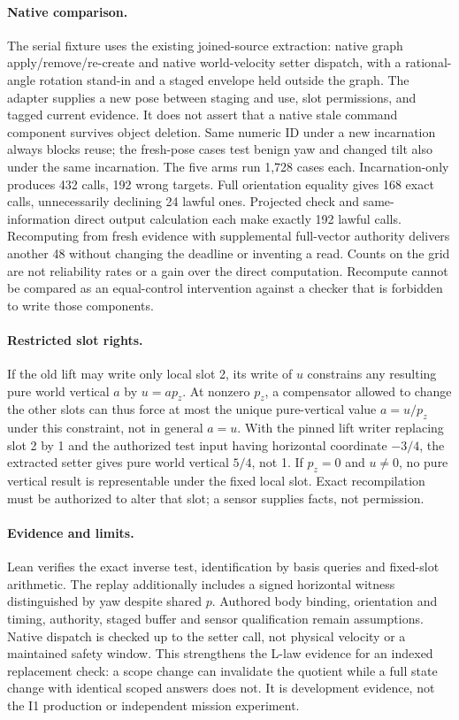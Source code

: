 \documentclass{article}
\begin{document}
\paragraph{Native comparison.}
The serial fixture uses the existing joined-source extraction: native graph apply/remove/re-create and native world-velocity setter dispatch, with a rational-angle rotation stand-in and a staged envelope held outside the graph. The adapter supplies a new pose between staging and use, slot permissions, and tagged current evidence. It does not assert that a native stale command component survives object deletion. Same numeric ID under a new incarnation always blocks reuse; the fresh-pose cases test benign yaw and changed tilt also under the same incarnation. The five arms run 1,728 cases each. Incarnation-only produces 432 calls, 192 wrong targets. Full orientation equality gives 168 exact calls, unnecessarily declining 24 lawful ones. Projected check and same-information direct output calculation each make exactly 192 lawful calls. Recomputing from fresh evidence with supplemental full-vector authority delivers another 48 without changing the deadline or inventing a read. Counts on the grid are not reliability rates or a gain over the direct computation. Recompute cannot be compared as an equal-control intervention against a checker that is forbidden to write those components.

\paragraph{Restricted slot rights.}
If the old lift may write only local slot 2, its write of \(u\) constrains any resulting pure world vertical \(a\) by \(u=a p_z\). At nonzero \(p_z\), a compensator allowed to change the other slots can thus force at most the unique pure-vertical value \(a=u/p_z\) under this constraint, not in general \(a=u\). With the pinned lift writer replacing slot 2 by 1 and the authorized test input having horizontal coordinate \(-3/4\), the extracted setter gives pure world vertical \(5/4\), not 1. If \(p_z=0\) and \(u\ne0\), no pure vertical result is representable under the fixed local slot. Exact recompilation must be authorized to alter that slot; a sensor supplies facts, not permission.

\paragraph{Evidence and limits.}
Lean verifies the exact inverse test, identification by basis queries and fixed-slot arithmetic. The replay additionally includes a signed horizontal witness distinguished by yaw despite shared \(p\). Authored body binding, orientation and timing, authority, staged buffer and sensor qualification remain assumptions. Native dispatch is checked up to the setter call, not physical velocity or a maintained safety window. This strengthens the L-law evidence for an indexed replacement check: a scope change can invalidate the quotient while a full state change with identical scoped answers does not. It is development evidence, not the I1 production or independent mission experiment.
\end{document}
